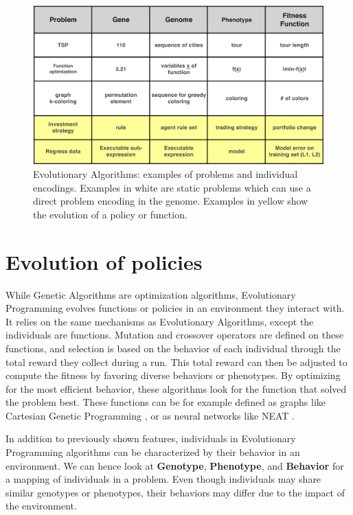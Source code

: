 \begin{figure}[H]
 \centering
 \captionsetup{justification=centering, margin=0.5cm}
 \includegraphics[width=14cm]{images/gp_types_of_eas.png}
 \caption{\label{fig:GP-classes} Evolutionary Algorithms: examples of problems and individual encodings. Examples in white are static problems which can use a direct problem encoding in the genome. Examples in yellow show the evolution of a policy or function. \cite{intro-gp}}
\end{figure}

\section{Evolution of policies}

While Genetic Algorithms are optimization algorithms, Evolutionary Programming evolves functions or policies in an environment they interact with. It relies on the same mechanisms as Evolutionary Algorithms, except the individuals are functions. Mutation and crossover operators are defined on these functions, and selection is based on the behavior of each individual through the total reward they collect during a run. This total reward can then be adjusted to compute the fitness by favoring diverse behaviors or phenotypes. By optimizing for the most efficient behavior, these algorithms look for the function that solved the problem best. 
These functions can be for example defined as graphs like Cartesian Genetic Programming \cite{CGP}, or as neural networks like NEAT \cite{NEAT_1}.

In addition to previously shown features, individuals in Evolutionary Programming algorithms can be characterized by their behavior in an environment. We can hence look at \textbf{Genotype}, \textbf{Phenotype}, and \textbf{Behavior} for a mapping of individuals in a problem. Even though individuals may share similar genotypes or phenotypes, their behaviors may differ due to the impact of the environment. 


